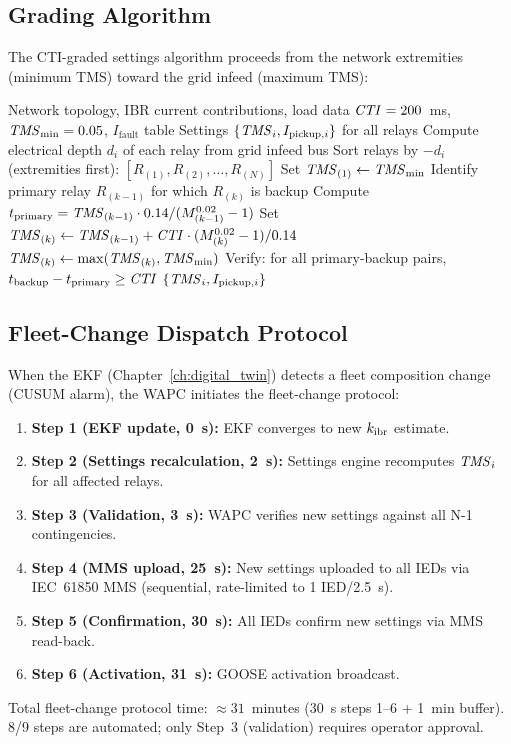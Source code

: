 \subsection{Grading Algorithm}

The CTI-graded settings algorithm proceeds from the network extremities
(minimum TMS) toward the grid infeed (maximum TMS):

\begin{algorithm}[htbp]
\caption{CTI-Graded Settings Engine}
\label{alg:ch9_settings}
\begin{algorithmic}[1]
\Require Network topology, IBR current contributions, load data
\Require $\mathit{CTI} = 200$~ms, $\mathit{TMS}_\mathrm{min} = 0.05$, $I_\mathrm{fault}$ table
\Ensure Settings $\{\mathit{TMS}_i, I_{\mathrm{pickup},i}\}$ for all relays
\State Compute electrical depth $d_i$ of each relay from grid infeed bus
\State Sort relays by $-d_i$ (extremities first): $[R_{(1)}, R_{(2)}, \ldots, R_{(N)}]$
\State Set $\mathit{TMS}_{(1)} \leftarrow \mathit{TMS}_\mathrm{min}$ 
  \State Identify primary relay $R_{(k-1)}$ for which $R_{(k)}$ is backup
  \State Compute $t_\mathrm{primary} = \mathit{TMS}_{(k-1)} \cdot 0.14 / (M_{(k-1)}^{0.02} - 1)$
  \State Set $\mathit{TMS}_{(k)} \leftarrow \mathit{TMS}_{(k-1)} + \mathit{CTI} \cdot (M_{(k)}^{0.02} - 1)/0.14$
  \State $\mathit{TMS}_{(k)} \leftarrow \max(\mathit{TMS}_{(k)}, \mathit{TMS}_\mathrm{min})$
\EndFor
\State Verify: for all primary-backup pairs, $t_\mathrm{backup} - t_\mathrm{primary} \geq \mathit{CTI}$
\State \Return $\{\mathit{TMS}_i, I_{\mathrm{pickup},i}\}$
\end{algorithmic}
\end{algorithm}

\subsection{Fleet-Change Dispatch Protocol}

When the EKF (Chapter~\ref{ch:digital_twin}) detects a fleet composition
change (CUSUM alarm), the WAPC initiates the fleet-change protocol:
\begin{enumerate}
\item \textbf{Step 1 (EKF update, 0~s):} EKF converges to new $k_\mathrm{ibr}$ estimate.
\item \textbf{Step 2 (Settings recalculation, 2~s):} Settings engine
      recomputes $\mathit{TMS}_i$ for all affected relays.
\item \textbf{Step 3 (Validation, 3~s):} WAPC verifies new settings
      against all N-1 contingencies.
\item \textbf{Step 4 (MMS upload, 25~s):} New settings uploaded to all
      IEDs via IEC~61850 MMS (sequential, rate-limited to 1 IED/2.5~s).
\item \textbf{Step 5 (Confirmation, 30~s):} All IEDs confirm new settings
      via MMS read-back.
\item \textbf{Step 6 (Activation, 31~s):} GOOSE activation broadcast.
\end{enumerate}
Total fleet-change protocol time: $\approx 31$~minutes (30~s steps 1--6 +
1~min buffer). 8/9 steps are automated; only Step~3 (validation) requires
operator approval.

